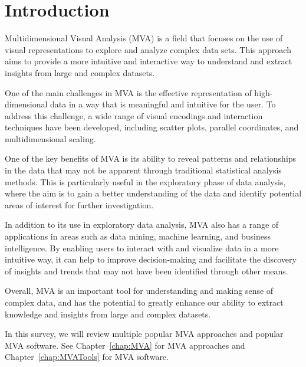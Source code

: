 %
%
% 
% 
% 


\chapter{Introduction}

\label{chap:Intro}



Multidimensional Visual Analysis (MVA) is a field that focuses on the
use of visual representations to explore and analyze complex data
sets. This approach aims to provide a more intuitive and interactive
way to understand and extract insights from large and complex
datasets.

One of the main challenges in MVA is the effective representation of
high-dimensional data in a way that is meaningful and intuitive for
the user. To address this challenge, a wide range of visual encodings
and interaction techniques have been developed, including scatter
plots, parallel coordinates, and multidimensional scaling.

One of the key benefits of MVA is its ability to reveal patterns and
relationships in the data that may not be apparent through traditional
statistical analysis methods. This is particularly useful in the
exploratory phase of data analysis, where the aim is to gain a better
understanding of the data and identify potential areas of interest for
further investigation.

In addition to its use in exploratory data analysis, MVA also has a
range of applications in areas such as data mining, machine learning,
and business intelligence. By enabling users to interact with and
visualize data in a more intuitive way, it can help to improve
decision-making and facilitate the discovery of insights and trends
that may not have been identified through other means.

Overall, MVA is an important tool for understanding and making sense
of complex data, and has the potential to greatly enhance our ability
to extract knowledge and insights from large and complex datasets.

In this survey, we will review multiple popular MVA approaches and
popular MVA software. See Chapter~\ref{chap:MVA} for MVA
approaches and Chapter~\ref{chap:MVATools} for MVA software.

